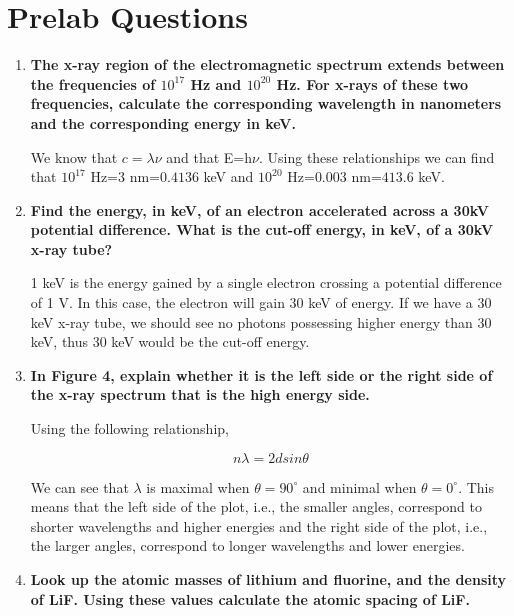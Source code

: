 \documentclass[justified]{tufte-book}
\begin{document}
\section{Prelab Questions}
\begin{enumerate}

\item {\bf The x-ray region of the electromagnetic spectrum extends between the frequencies of $10^{17}$ Hz and $10^{20}$ Hz. For x-rays of these two frequencies, calculate the corresponding wavelength in nanometers and the corresponding energy in keV.}\newline

We know that $c=\lambda\nu$ and that E=h$\nu$. Using these relationships we can find that $10^{17}$ Hz=$3$ nm=$0.4136$ keV and $10^{20}$ Hz=$0.003$ nm=$413.6$ keV.

\item {\bf Find the energy, in keV, of an electron accelerated across a 30kV potential difference. What is the cut-off energy, in keV, of a 30kV x-ray tube?}\newline

1 keV is the energy gained by a single electron crossing a potential difference of 1 V. In this case, the electron will gain 30 keV of energy. If we have a 30 keV x-ray tube, we should see no photons possessing higher energy than 30 keV, thus 30 keV would be the cut-off energy.

\item {\bf In Figure 4, explain whether it is the left side or the right side of the x-ray spectrum that is the high energy side.}\newline

Using the following relationship,

\begin{equation}
n\lambda=2dsin\theta
\label{equ:twcg1}
\end{equation}

We can see that $\lambda$ is maximal when $\theta=90^{\circ}$ and minimal when $\theta=0^{\circ}$. This means that the left side of the plot, i.e., the smaller angles, correspond to shorter wavelengths and higher energies and the right side of the plot, i.e., the larger angles, correspond to longer wavelengths and lower energies.

\item {\bf Look up the atomic masses of lithium and fluorine, and the density of LiF. Using these values calculate the atomic spacing of LiF.}\newline


\end{enumerate}
\end{document}

